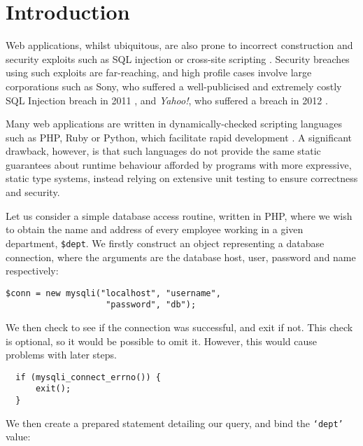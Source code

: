 \documentclass[preprint]{sigplanconf}
\begin{document}



\section{Introduction}

Web applications, whilst ubiquitous, are also prone to incorrect construction
and security exploits such as SQL injection \cite{owasp:sqli} or cross-site
scripting \cite{owasp:xss}. Security breaches using such exploits are
far-reaching, and high profile cases involve large corporations such as Sony,
who suffered a well-publicised and extremely costly SQL Injection breach in
2011 \cite{ieee:sony}, and \textit{Yahoo!}, who suffered a breach in 2012
\cite{imperva:yahoo}. 

Many web applications are written in dynamically-checked scripting languages
such as PHP, Ruby or Python, which facilitate rapid development
\cite{w3techs:webpls}. A significant drawback, however, is that such languages
do not provide  the same static guarantees about runtime behaviour afforded by
programs with more expressive, static type systems, instead relying on
extensive unit testing to ensure correctness and security. 

Let us consider a simple database access routine, written in
PHP, where we wish to obtain the name and address of every employee working in
a given department, \texttt{\$dept}. We firstly construct an object
representing a database connection, where the arguments are the database host,
user, password and name respectively:


%
\begin{Verbatim}
$conn = new mysqli("localhost", "username", 
                    "password", "db");
\end{Verbatim}
%
We then check to see if the connection was successful, and exit
if not.  This check is optional, so
it would be possible to omit it. However, this would cause
problems with later steps.

%
\begin{Verbatim}
  if (mysqli_connect_errno()) {
      exit();
  }
\end{Verbatim}
%
We then create a prepared statement detailing our query, and bind the
\texttt{`dept'} value:
\end{document}
